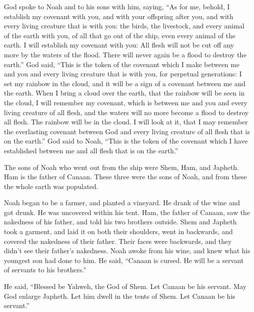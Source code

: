  God spoke to Noah and to his sons with him, saying,
 ``As for me, behold, I establish my covenant with you, and
with your offspring after you,  and with every living
creature that is with you: the birds, the livestock, and every animal of
the earth with you, of all that go out of the ship, even every animal of
the earth.  I will establish my covenant with you: All
flesh will not be cut off any more by the waters of the flood. There
will never again be a flood to destroy the earth.''  God
said, ``This is the token of the covenant which I make between me and
you and every living creature that is with you, for perpetual
generations:  I set my rainbow in the cloud, and it will be
a sign of a covenant between me and the earth.  When I
bring a cloud over the earth, that the rainbow will be seen in the
cloud,  I will remember my covenant, which is between me
and you and every living creature of all flesh, and the waters will no
more become a flood to destroy all flesh.  The rainbow will
be in the cloud. I will look at it, that I may remember the everlasting
covenant between God and every living creature of all flesh that is on
the earth.''  God said to Noah, ``This is the token of the
covenant which I have established between me and all flesh that is on
the earth.''

 The sons of Noah who went out from the ship were Shem,
Ham, and Japheth. Ham is the father of Canaan.  These three
were the sons of Noah, and from these the whole earth was populated.

 Noah began to be a farmer, and planted a vineyard.
 He drank of the wine and got drunk. He was uncovered
within his tent.  Ham, the father of Canaan, saw the
nakedness of his father, and told his two brothers outside.
 Shem and Japheth took a garment, and laid it on both their
shoulders, went in backwards, and covered the nakedness of their father.
Their faces were backwards, and they didn't see their father's
nakedness.  Noah awoke from his wine, and knew what his
youngest son had done to him.  He said, ``Canaan is cursed.
He will be a servant of servants to his brothers.''

 He said, ``Blessed be Yahweh, the God of Shem. Let Canaan
be his servant.  May God enlarge Japheth. Let him dwell in
the tents of Shem. Let Canaan be his servant.''


